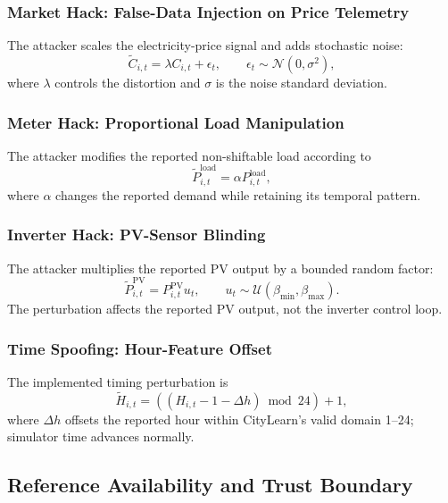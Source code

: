 \documentclass[conference]{IEEEtran}
\begin{document}
\subsubsection{Market Hack: False-Data Injection on Price Telemetry}
The attacker scales the electricity-price signal and adds stochastic noise:
\begin{equation}
\widetilde{C}_{i,t}=\lambda C_{i,t}+\epsilon_t,
\qquad \epsilon_t\sim\mathcal{N}(0,\sigma^2),
\label{eq:market}
\end{equation}
where $\lambda$ controls the distortion and $\sigma$ is the noise standard deviation.

\subsubsection{Meter Hack: Proportional Load Manipulation}
The attacker modifies the reported non-shiftable load according to
\begin{equation}
\widetilde{P}_{i,t}^{\mathrm{load}}=\alpha P_{i,t}^{\mathrm{load}},
\label{eq:meter}
\end{equation}
where $\alpha$ changes the reported demand while retaining its temporal pattern.

\subsubsection{Inverter Hack: PV-Sensor Blinding}
The attacker multiplies the reported PV output by a bounded random factor:
\begin{equation}
\widetilde{P}_{i,t}^{\mathrm{PV}}=P_{i,t}^{\mathrm{PV}}u_t,
\qquad u_t\sim\mathcal{U}(\beta_{\min},\beta_{\max}).
\label{eq:inverter}
\end{equation}
The perturbation affects the reported PV output, not the inverter control loop.

\subsubsection{Time Spoofing: Hour-Feature Offset}
The implemented timing perturbation is
\begin{equation}
\widetilde{H}_{i,t}=((H_{i,t}-1-\Delta h)\bmod 24)+1,
\label{eq:time}
\end{equation}
where $\Delta h$ offsets the reported hour within CityLearn's valid domain 1--24; simulator time advances normally.


\subsection{Reference Availability and Trust Boundary}
\end{document}
